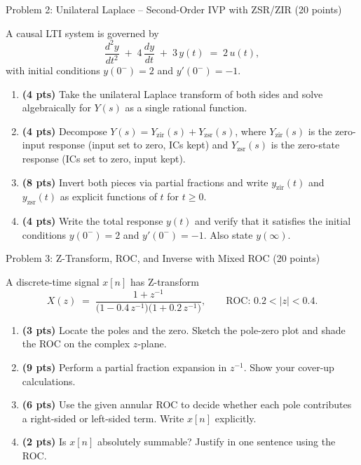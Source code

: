 \documentclass[11pt]{article}
\begin{document}
\newpage

\begin{problembox}{Problem 2: Unilateral Laplace -- Second-Order IVP with ZSR/ZIR \hfill (20 points)}
\end{problembox}

\vspace{4pt}
A causal LTI system is governed by
\[
\frac{d^2 y}{dt^2} \;+\; 4\,\frac{dy}{dt} \;+\; 3\,y(t) \;=\; 2\,u(t),
\]
with initial conditions $y(0^-) = 2$ and $y'(0^-) = -1$.
\begin{enumerate}[label=(\alph*)]
    \item \textbf{(4 pts)} Take the unilateral Laplace transform of both sides and solve algebraically for $Y(s)$ as a single rational function.
    \item \textbf{(4 pts)} Decompose $Y(s) = Y_{\text{zir}}(s) + Y_{\text{zsr}}(s)$, where $Y_{\text{zir}}(s)$ is the zero-input response (input set to zero, ICs kept) and $Y_{\text{zsr}}(s)$ is the zero-state response (ICs set to zero, input kept).
    \item \textbf{(8 pts)} Invert both pieces via partial fractions and write $y_{\text{zir}}(t)$ and $y_{\text{zsr}}(t)$ as explicit functions of $t$ for $t \ge 0$.
    \item \textbf{(4 pts)} Write the total response $y(t)$ and verify that it satisfies the initial conditions $y(0^-)=2$ and $y'(0^-)=-1$. Also state $y(\infty)$.
\end{enumerate}

\newpage

\begin{problembox}{Problem 3: Z-Transform, ROC, and Inverse with Mixed ROC \hfill (20 points)}
\end{problembox}

\vspace{4pt}
A discrete-time signal $x[n]$ has Z-transform
\[
X(z) \;=\; \frac{1 + z^{-1}}{\bigl(1 - 0.4\,z^{-1}\bigr)\bigl(1 + 0.2\,z^{-1}\bigr)}, \qquad \text{ROC: } 0.2 < |z| < 0.4.
\]
\begin{enumerate}[label=(\alph*)]
    \item \textbf{(3 pts)} Locate the poles and the zero. Sketch the pole-zero plot and shade the ROC on the complex $z$-plane.
    \item \textbf{(9 pts)} Perform a partial fraction expansion in $z^{-1}$. Show your cover-up calculations.
    \item \textbf{(6 pts)} Use the given annular ROC to decide whether each pole contributes a right-sided or left-sided term. Write $x[n]$ explicitly.
    \item \textbf{(2 pts)} Is $x[n]$ absolutely summable? Justify in one sentence using the ROC.
\end{enumerate}
\end{document}
